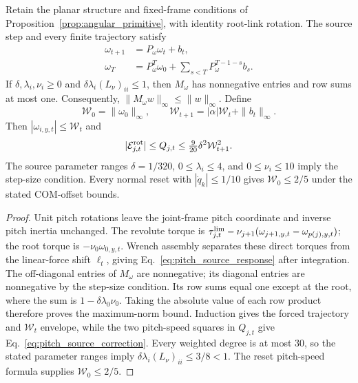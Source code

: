 \begin{proposition}
\label{prop:pitch_damping}
Retain the planar structure and fixed-frame conditions of Proposition~\ref{prop:angular_primitive}, with identity root-link rotation.
The source step and every finite trajectory satisfy
\begin{align}
 \omega_{t+1}&=P_\omega\omega_t+b_t,\nonumber\\
 \omega_T&=P_\omega^T\omega_0+\sum_{s<T}P_\omega^{T-1-s}b_s.
 \label{eq:pitch_source_response}
\end{align}
If $\delta,\lambda_i,\nu_i\ge0$ and $\delta\lambda_i(L_\nu)_{ii}\le1$, then $M_\omega$ has nonnegative entries and row sums at most one.
Consequently, $\|M_\omega w\|_\infty\le\|w\|_\infty$.
Define
\begin{equation}
 \mathcal W_0=\|\omega_0\|_\infty,\qquad
 \mathcal W_{t+1}=|\alpha|\mathcal W_t+\|b_t\|_\infty.
\end{equation}
Then $|\omega_{i,y,t}|\le\mathcal W_t$ and
\begin{equation}
 |\mathcal E^{\rm rot}_{j,t}|\le Q_{j,t}
             \le\tfrac9{20}\delta^2\mathcal W_{t+1}^2.
 \label{eq:pitch_source_correction}
\end{equation}
The source parameter ranges $\delta=1/320$, $0\le\lambda_i\le4$, and $0\le\nu_i\le10$ imply the step-size condition.
Every normal reset with $|\dot q_k|\le1/10$ gives $\mathcal W_0\le2/5$ under the stated COM-offset bounds.
\end{proposition}

\begin{proof}
Unit pitch rotations leave the joint-frame pitch coordinate and inverse pitch inertia unchanged.
The revolute torque is $\tau^{\rm lim}_{j,t}-\nu_{j+1}(\omega_{j+1,y,t}-\omega_{p(j),y,t})$; the root torque is $-\nu_0\omega_{0,y,t}$.
Wrench assembly separates these direct torques from the linear-force shift $\ell_t$, giving Eq.~\eqref{eq:pitch_source_response} after integration.
The off-diagonal entries of $M_\omega$ are nonnegative; its diagonal entries are nonnegative by the step-size condition.
Its row sums equal one except at the root, where the sum is $1-\delta\lambda_0\nu_0$.
Taking the absolute value of each row product therefore proves the maximum-norm bound.
Induction gives the forced trajectory and $\mathcal W_t$ envelope, while the two pitch-speed squares in $Q_{j,t}$ give Eq.~\eqref{eq:pitch_source_correction}.
Every weighted degree is at most $30$, so the stated parameter ranges imply $\delta\lambda_i(L_\nu)_{ii}\le3/8<1$.
The reset pitch-speed formula supplies $\mathcal W_0\le2/5$.
\end{proof}

